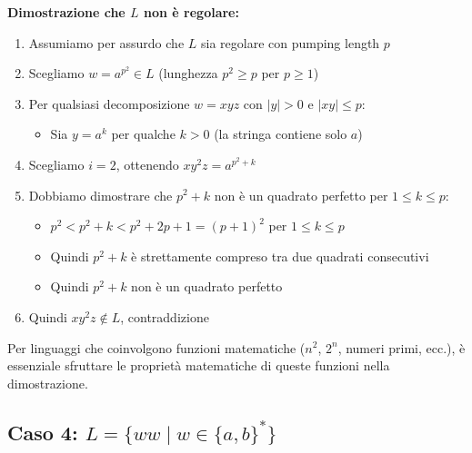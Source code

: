 \documentclass[12pt,a4paper]{article}
\begin{document}
\begin{risoluzione}
\textbf{Dimostrazione che $L$ non è regolare:}
\begin{enumerate}
    \item Assumiamo per assurdo che $L$ sia regolare con pumping length $p$
    \item Scegliamo $w = a^{p^2} \in L$ (lunghezza $p^2 \geq p$ per $p \geq 1$)
    \item Per qualsiasi decomposizione $w = xyz$ con $|y| > 0$ e $|xy| \leq p$:
    \begin{itemize}
        \item Sia $y = a^k$ per qualche $k > 0$ (la stringa contiene solo $a$)
    \end{itemize}
    \item Scegliamo $i = 2$, ottenendo $xy^2z = a^{p^2+k}$
    \item Dobbiamo dimostrare che $p^2+k$ non è un quadrato perfetto per $1 \leq k \leq p$:
    \begin{itemize}
        \item $p^2 < p^2+k < p^2+2p+1 = (p+1)^2$ per $1 \leq k \leq p$
        \item Quindi $p^2+k$ è strettamente compreso tra due quadrati consecutivi
        \item Quindi $p^2+k$ non è un quadrato perfetto
    \end{itemize}
    \item Quindi $xy^2z \not\in L$, contraddizione
\end{enumerate}
\end{risoluzione}

\begin{suggerimento}
Per linguaggi che coinvolgono funzioni matematiche ($n^2$, $2^n$, numeri primi, ecc.), è essenziale sfruttare le proprietà matematiche di queste funzioni nella dimostrazione.
\end{suggerimento}

\subsection{Caso 4: $L = \{ww \mid w \in \{a,b\}^*\}$}
\end{document}
